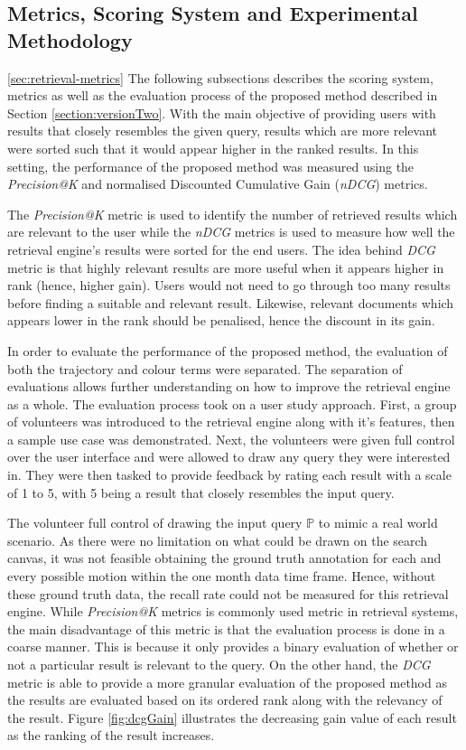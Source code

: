 \subsection{Metrics, Scoring System and Experimental Methodology}
\ref{sec:retrieval-metrics}
The following subsections describes the scoring system, metrics as well as the
evaluation process of the proposed method described in Section
\ref{section:versionTwo}. With the main objective of providing users with
results that closely resembles the given query, results which are more relevant
were sorted such that it would appear higher in the ranked results. In this
setting, the performance of the proposed method was measured using the
\textit{Precision@K} and normalised Discounted Cumulative Gain (\textit{nDCG})
metrics.

The \textit{Precision@K} metric is used to identify the number of retrieved
results which are relevant to the user while the \textit{nDCG} metrics is used
to measure how well the retrieval engine's results were sorted for the end
users. The idea behind \textit{DCG} metric is that highly relevant results are
more useful when it appears higher in rank (hence, higher gain). Users would
not need to go through too many results before finding a suitable and relevant
result. Likewise, relevant documents which appears lower in the rank should be
penalised, hence the discount in its gain.

In order to evaluate the performance of the proposed method, the evaluation of
both the trajectory and colour terms were separated. The separation of
evaluations allows further understanding on how to improve the retrieval engine
as a whole. The evaluation process took on a user study approach.
First, a group of volunteers was introduced to the retrieval engine along with
it's features, then a sample use case was demonstrated. Next, the volunteers were
given full control over the user interface and were allowed to draw any query they were interested in. They were then
tasked to provide feedback by rating each result with a scale of 1 to 5, with
5 being a result that closely resembles the input query.

The volunteer full control of drawing the input query $\mathbb{P}$
to mimic a real world scenario. As there were no limitation on what could be
drawn on the search canvas, it was not feasible obtaining the ground truth
annotation for each and every possible motion within the one month data time
frame. Hence, without these ground truth data, the recall rate could not be
measured for this retrieval engine.
While \textit{Precision@K} metrics is commonly used metric in retrieval
systems, the main disadvantage of this metric is that the evaluation process
is done in a coarse manner. This is because it only provides a binary
evaluation of whether or not a particular result is relevant to the query. On
the other hand, the \textit{DCG} metric is able to provide a more granular
evaluation of the proposed method as the results are evaluated based on its
ordered rank along with the relevancy of the result. Figure \ref{fig:dcgGain}
illustrates the decreasing gain value of each result as the ranking of the
result increases.

